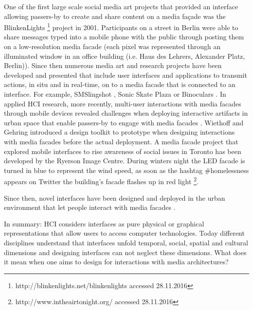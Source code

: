
One of the first large scale social media art projects that provided an interface allowing passers-by to create and share content on a media façade was the BlinkenLights \footnote{http://blinkenlights.net/blinkenlights accessed 28.11.2016} project in 2001. Participants on a street in Berlin were able to share messages typed into a mobile phone with the public through posting them on a low-resolution media facade (each pixel was represented through an illuminated window in an office building (i.e. Haus des Lehrers, Alexander Platz, Berlin)). 
Since then numerous media art and research projects have been developed and presented that include user interfaces and applications to transmit actions, in situ and in real-time, on to a media facade that is connected to an interface. 
For example, SMSlingshot \cite{Fischer_2012}, Sonic Skate Plaza \cite{Serret_2013} or Binoculars \cite{Guljajeva_2013}.
In applied HCI research, more recently, multi-user interactions with media facades through mobile devices revealed challenges when deploying interactive artifacts in urban space that enable passers-by to engage with media facades \cite{Boring2011}. 
Wiethoff and Gehring \cite{Wiethoff2012} introduced a design toolkit to prototype when designing interactions with media facades before the actual deployment. 
 A media facade project that explored mobile interfaces to rise awareness of social issues in Toronto has been developed by the Ryerson Image Centre. During winters night the LED facade is turned in blue to represent the wind speed, as soon as the hashtag \#homelessness appears on Twitter the building's facade flashes up in red light \footnote{http://www.intheairtonight.org/ accessed 28.11.2016}. 

Since then, novel interfaces have been designed and deployed in the urban environment that let people interact with media facades \cite{Hoggenmueller_2014}.


In summary: HCI considers interfaces as pure physical or graphical representations that allow users to access computer technologies. Today different disciplines understand that interfaces unfold temporal, social, spatial and cultural dimensions and designing interfaces can not neglect these dimensions.
What does it mean when one aims to design for interactions with media architectures?



